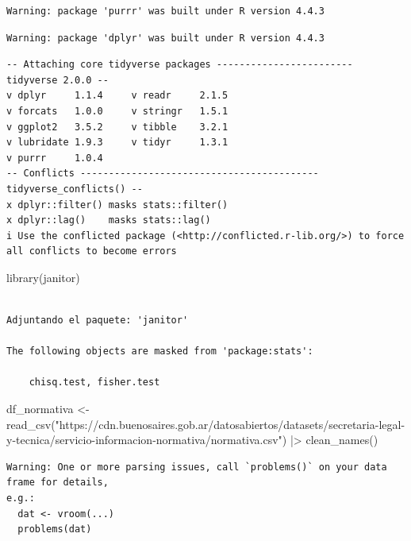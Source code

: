 \documentclass[
  letterpaper,
  DIV=11,
  numbers=noendperiod]{scrreprt}
\newenvironment{Shaded}{\begin{snugshade}}{\end{snugshade}}
\newcommand{\FunctionTok}[1]{\textcolor[rgb]{0.28,0.35,0.67}{#1}}
\newcommand{\NormalTok}[1]{\textcolor[rgb]{0.00,0.23,0.31}{#1}}
\newcommand{\OtherTok}[1]{\textcolor[rgb]{0.00,0.23,0.31}{#1}}
\newcommand{\SpecialCharTok}[1]{\textcolor[rgb]{0.37,0.37,0.37}{#1}}
\newcommand{\StringTok}[1]{\textcolor[rgb]{0.13,0.47,0.30}{#1}}
\begin{document}
\begin{verbatim}
Warning: package 'purrr' was built under R version 4.4.3
\end{verbatim}

\begin{verbatim}
Warning: package 'dplyr' was built under R version 4.4.3
\end{verbatim}

\begin{verbatim}
-- Attaching core tidyverse packages ------------------------ tidyverse 2.0.0 --
v dplyr     1.1.4     v readr     2.1.5
v forcats   1.0.0     v stringr   1.5.1
v ggplot2   3.5.2     v tibble    3.2.1
v lubridate 1.9.3     v tidyr     1.3.1
v purrr     1.0.4     
-- Conflicts ------------------------------------------ tidyverse_conflicts() --
x dplyr::filter() masks stats::filter()
x dplyr::lag()    masks stats::lag()
i Use the conflicted package (<http://conflicted.r-lib.org/>) to force all conflicts to become errors
\end{verbatim}

\begin{Shaded}
\begin{Highlighting}[]
\FunctionTok{library}\NormalTok{(janitor)}
\end{Highlighting}
\end{Shaded}

\begin{verbatim}

Adjuntando el paquete: 'janitor'

The following objects are masked from 'package:stats':

    chisq.test, fisher.test
\end{verbatim}

\begin{Shaded}
\begin{Highlighting}[]
\NormalTok{df\_normativa }\OtherTok{\textless{}{-}} \FunctionTok{read\_csv}\NormalTok{(}\StringTok{"https://cdn.buenosaires.gob.ar/datosabiertos/datasets/secretaria{-}legal{-}y{-}tecnica/servicio{-}informacion{-}normativa/normativa.csv"}\NormalTok{) }\SpecialCharTok{|\textgreater{}} 
  \FunctionTok{clean\_names}\NormalTok{()}
\end{Highlighting}
\end{Shaded}

\begin{verbatim}
Warning: One or more parsing issues, call `problems()` on your data frame for details,
e.g.:
  dat <- vroom(...)
  problems(dat)
\end{verbatim}
\end{document}

